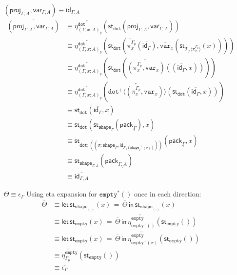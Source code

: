 \documentclass[10pt]{article}
\theoremstyle{definition}
\newcommand{\sigmacl}[3]{\ensuremath{(#1{:}#2,#3)}}
\newcommand{\id}{\mathsf{id}}
\newcommand{\rewrite}[2]{\overleftarrow{#1}(#2)}
\newcommand\St[2]{\ensuremath{{#1}^*(#2)}}
\newcommand\StI[2]{\ensuremath{\mathsf{st}_{#1}(#2)}}
\newcommand\StE[4]{\ensuremath{\mathsf{let} \, \StI{#1}{#3} \, = \, {#2} \, \mathsf{in} \, #4}}
\newcommand\TrPlus[2]{\ensuremath{{#1}^+(#2)}}
\newcommand\El[2]{\mathcal{T}_{#1}(#2)}
\newcommand\ApEl[2]{\mathcal{T}_{#1}\langle#2\rangle}
\newcommand\ApPlus[2]{\ensuremath{{#1}^+ \langle #2 \rangle }}
\newcommand\pack[1]{\ensuremath{\mathsf{pack}_{#1}}}
\newcommand{\modeof}[1]{{#1}_p}
\newcommand{\tdot}{\ensuremath{\mathtt{dot}}}
\newcommand{\tempty}{\ensuremath{\mathtt{empty}}}
\newcommand{\tshape}[1]{\ensuremath{\mathtt{shape}_{#1}}}
\newcommand{\upstairs}[1]{\overline{#1}}
\newcommand{\downstairs}[1]{\underline{#1}}
\newcommand\proj[1]{\ensuremath{\mathsf{proj}_{#1}}}
\newcommand\qvar[1]{\ensuremath{\mathsf{var}_{#1}}}
\newcommand\var[1]{\ensuremath{\mathtt{var}_{#1}}}
\begin{document}
\begin{enumerate}[style = multiline, labelwidth = 80pt]
\item[{$(\proj{\Gamma,A}, \qvar{\Gamma,A}) \equiv \id_{\Gamma, A}$}] 
\begin{align*}
\upstairs{(\proj{\Gamma,A}, \qvar{\Gamma,A})}
&\equiv \rewrite{\eta^\tdot_{\modeof{(\Gamma, x : A)}}}{\StI{\tdot}{\upstairs{\proj{\Gamma,A}}, \upstairs{\qvar{\Gamma,A}}}} \\
&\equiv \rewrite{\eta^\tdot_{\modeof{(\Gamma, x : A)}}}{\StI{\tdot}{\rewrite{\pi^{\modeof{\Gamma}}_x}{\upstairs{\id_\Gamma}}, \rewrite{\var{x}}{\StI{\ApEl{p}{\pi^{\modeof{\Gamma}}_x}}{x}}}} \\
&\equiv \rewrite{\eta^\tdot_{\modeof{(\Gamma, x : A)}}}{\StI{\tdot}{\rewrite{(\pi^{\modeof{\Gamma}}_x, \var{x})}{(\upstairs{\id_\Gamma}, x)}}}\\
&\equiv \rewrite{\eta^\tdot_{\modeof{(\Gamma, x : A)}}}{\rewrite{\ApPlus{\tdot}{(\pi^{\modeof{\Gamma}}_x, \var{x})}}{\StI{\tdot}{\upstairs{\id_\Gamma}, x}}}\\
&\equiv \StI{\tdot}{\upstairs{\id_\Gamma}, x} \\
&\equiv \StI{\tdot}{\StI{\tshape{\Gamma}}{\pack{\downstairs{\Gamma}}}, x}\\
&\equiv \StI{\tdot ; (\sigmacl{\sigma}{\tshape{\Gamma}}{\id_{\El{p}{\TrPlus{\tshape{\Gamma}}{\sigma}}}})}{\pack{\downstairs{\Gamma}}, x} \\
&\equiv \StI{\tshape{\Gamma, A}}{\pack{\downstairs{\Gamma, A}}} \\
&\equiv \upstairs{\id_{\Gamma, A}}
\end{align*}

\item[$\Theta \equiv \epsilon_\Gamma$] 
Using eta expansion for $\St{\tempty}{}$ once in each direction:
\begin{align*}
\upstairs{\Theta}
&\equiv \StE{\tshape{(\cdot)}}{\upstairs{\Theta}}{x}{\StI{\tshape{(\cdot)}}{x}} \\
&\equiv \StE{\tempty}{\upstairs{\Theta}}{x}{\rewrite{\eta^\tempty_{\TrPlus{\tempty}{}}}{\StI{\tempty}{}}} \\
&\equiv \StE{\tempty}{\upstairs{\Theta}}{x}{\rewrite{\eta^\tempty_{\TrPlus{\tempty}{x}}}{\StI{\tempty}{}}} \\
&\equiv \rewrite{\eta^\tempty_{\modeof{\Gamma}}}{\StI{\tempty}{}} \\
&\equiv \upstairs{\epsilon_\Gamma}
\end{align*}
\end{enumerate}
\end{document}
